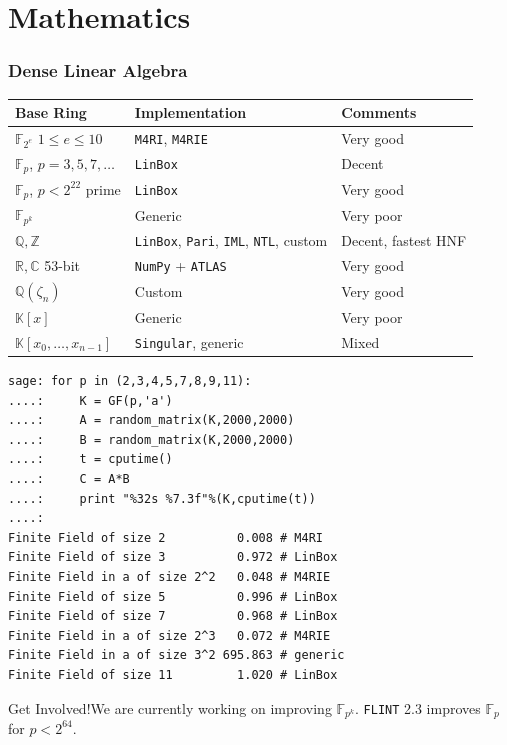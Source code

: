 \documentclass[10pt]{beamer}
\newcommand{\field}[1]{\mathbb{#1}}
\newcommand{\F}{\field{F}}
\newcommand{\getinvolved}[1]{\begin{block}{Get Involved!}#1\end{block}}
\begin{document}
\section{Mathematics}

\begin{frame}
\frametitle{Dense Linear Algebra}

\begin{center}
\footnotesize
\begin{tabular}{|l|l|l|}
\hline
 \textbf{Base Ring}  & \textbf{Implementation} & \textbf{Comments}\\
\hline
 $\F_{2^e}$ $1 \leq e\leq 10$ & {\tt M4RI}, {\tt M4RIE} & Very good\\
 $\F_p$, $p=3,5,7,\dots$      & {\tt LinBox}            & Decent\\
 $\F_p$, $p<2^{22}$ prime     & {\tt LinBox}            & Very good\\
 $\F_{p^k}$                   &  Generic                & Very poor\\
\hline
 $\field{Q},\field{Z}$        & {\tt LinBox}, {\tt Pari}, {\tt IML}, {\tt NTL}, custom & Decent, fastest HNF\\
 $\field{R},\field{C}$ 53-bit & {\tt NumPy} + {\tt ATLAS}  & Very good\\
 $\field{Q}(\zeta_n)$         & Custom                  & Very good \\
\hline
 $\field{K}[x]$ & Generic & Very poor\\
 $\field{K}[x_0,\dots,x_{n-1}]$ & {\tt Singular}, generic & Mixed\\
\hline
\end{tabular}
\end{center}

\framebreak

\begin{lstlisting}
sage: for p in (2,3,4,5,7,8,9,11):
....:     K = GF(p,'a')
....:     A = random_matrix(K,2000,2000)
....:     B = random_matrix(K,2000,2000)
....:     t = cputime()
....:     C = A*B
....:     print "%32s %7.3f"%(K,cputime(t))
....:
Finite Field of size 2          0.008 # M4RI
Finite Field of size 3          0.972 # LinBox
Finite Field in a of size 2^2   0.048 # M4RIE
Finite Field of size 5          0.996 # LinBox
Finite Field of size 7          0.968 # LinBox
Finite Field in a of size 2^3   0.072 # M4RIE
Finite Field in a of size 3^2 695.863 # generic
Finite Field of size 11         1.020 # LinBox
\end{lstlisting}

\getinvolved{We are currently working on improving $\F_{p^k}$.
{\tt FLINT} 2.3 improves $\F_p$ for $p<2^{64}$.}

\end{frame}
\end{document}
